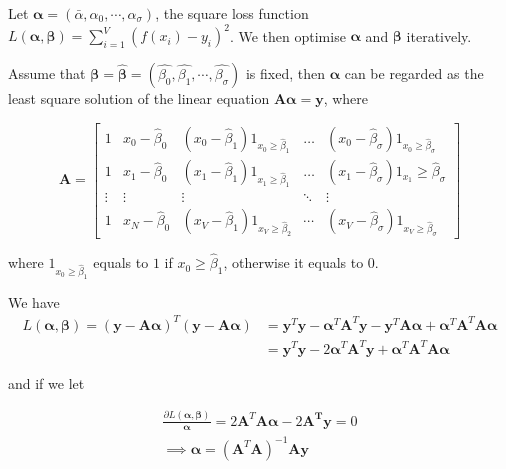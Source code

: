 Let $\boldsymbol{\alpha}=(\bar{\alpha},\alpha_0,\cdots,\alpha_\sigma)$, the square loss function $L(\boldsymbol{\alpha},\boldsymbol{\beta})=\sum_{i=1}^{V}(f(x_i)-y_i)^2$. We then optimise $\boldsymbol{\alpha}$ and $\boldsymbol{\beta}$ iteratively.

Assume that $\boldsymbol{\beta}=\hat{\boldsymbol{\beta}}=(\hat{\beta_0},\hat{\beta_1},\cdots,\hat{\beta_\sigma})$ is fixed, then $\boldsymbol{\alpha}$ can be regarded as the least square solution of the linear equation $\boldsymbol{A\alpha}=\boldsymbol{y}$, where

$$
\boldsymbol{A}=\left[\begin{array}{ccccc}
1 & x_{0}-\hat{\beta}_{0} & \left(x_{0}-\hat{\beta}_{1}\right) 1_{x_{0} \geq \hat{\beta}_{1}} & \ldots & \left(x_{0}-\hat{\beta}_{\sigma}\right) 1_{x_{0} \geq \hat{\beta}_{\sigma}} \\
1 & x_{1}-\hat{\beta}_{0} & \left(x_{1}-\hat{\beta}_{1}\right) 1_{x_{1} \geq \hat{\beta}_{1}} & \ldots & \left(x_{1}-\hat{\beta}_{\sigma}\right) 1_{x_{1}} \geq \hat{\beta}_{\sigma} \\
\vdots & \vdots & \vdots & \ddots & \vdots \\
1 & x_{N}-\hat{\beta}_{0} & \left(x_{V}-\hat{\beta}_{1}\right) 1_{x_{V} \geq \hat{\beta}_{2}} & \cdots & \left(x_{V}-\hat{\beta}_{\sigma}\right) 1_{x_{V} \geq \hat{\beta}_{\sigma}}
\end{array}\right]$$

where $1_{x_{0} \geq \hat{\beta}_{1}}$ equals to $1$ if ${x_{0} \geq \hat{\beta}_{1}}$, otherwise it equals to $0$.

We have
\begin{equation}
 \begin{split}
	L(\boldsymbol{\alpha},\boldsymbol{\beta}) 
	 =(\boldsymbol{y-A\alpha})^T(\boldsymbol{y-A\alpha}) 
	&=\boldsymbol{y}^T\boldsymbol{y}-\boldsymbol{\alpha}{^T}\boldsymbol{A}^T\boldsymbol{y}-\boldsymbol{y}^T\boldsymbol{A\alpha}+\boldsymbol{\alpha}^T\boldsymbol{A}^T\boldsymbol{A\alpha} \\
	& = \boldsymbol{y}^T\boldsymbol{y}-2\boldsymbol{\alpha}^T\boldsymbol{A}^T\boldsymbol{y}+\boldsymbol{\alpha}^T\boldsymbol{A}^T\boldsymbol{A}\boldsymbol{\alpha}
\end{split}
\end{equation}

and if we let

\begin{equation}
\label{alpha_form}
	\begin{split}
		\frac{\partial L(\boldsymbol{\alpha}, \boldsymbol{\beta})}{\boldsymbol{\alpha}}=2\boldsymbol{A}^T\boldsymbol{A}\boldsymbol{\alpha}-2\boldsymbol{A^T}\boldsymbol{y}=0 \\ \implies 
		\boldsymbol{\alpha}=(\boldsymbol{A}^T\boldsymbol{A})^{-1}\boldsymbol{A}\boldsymbol{y}
	\end{split}
\end{equation}


